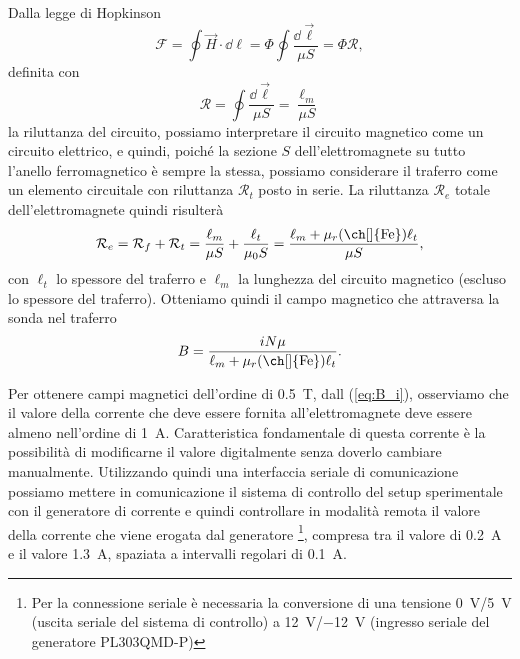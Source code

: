 \documentclass[
    prl,
    reprint, 
    superscriptaddress, 
    altaffilletter, 
    amsmath, 
    amssymb, 
    a4paper,
    varvw]{revtex4-2}
\begin{document}
Dalla legge di Hopkinson \begin{equation}
    \mathcal{F} = \oint \vec{H} \cdot \dd \ell = \Phi \oint \frac{\dd \vec{\ell}}{\mu S} = \Phi \mathcal{R},
\end{equation} definita con \[
    \mathcal{R} = \oint \frac{\dd \vec{\ell}}{\mu S} = \frac{\ell_m}{\mu S}
\] la riluttanza del circuito, possiamo interpretare il circuito magnetico come un circuito elettrico, e quindi, poiché la sezione $S$ dell'elettromagnete su tutto l'anello ferromagnetico è sempre la stessa, possiamo considerare il traferro come un elemento circuitale con riluttanza $\mathcal{R}_t$ posto in serie. La riluttanza $\mathcal{R}_e$ totale dell'elettromagnete quindi risulterà \begin{equation}
    \mathcal{R}_e = \mathcal{R}_f + \mathcal{R}_t = \frac{\ell_m}{\mu S} + \frac{\ell_t}{\mu_0 S} = \frac{\ell_m + \mu_r\text{(\ch[]{Fe})}\ell_t}{\mu S},
\end{equation} con $\ell_{t}$ lo spessore del traferro e $\ell_{m}$ la lunghezza del circuito magnetico (escluso lo spessore del traferro). Otteniamo quindi il campo magnetico che attraversa la sonda nel traferro \begin{equation}
    B = \frac{iN\mu}{\ell_m + \mu_r\text{(\ch[]{Fe})}\ell_t}.\label{eq:B_i}
\end{equation}

Per ottenere campi magnetici dell'ordine di \SI{0.5}{\tesla}, dall (\ref{eq:B_i}), osserviamo che il valore della corrente che deve essere fornita all'elettromagnete deve essere almeno nell'ordine di \SI{1}{\ampere}. Caratteristica fondamentale di questa corrente è la possibilità di modificarne il valore digitalmente senza doverlo cambiare manualmente. Utilizzando quindi una interfaccia seriale di comunicazione possiamo mettere in comunicazione il sistema di controllo del setup sperimentale con il generatore di corrente e quindi controllare in modalità remota il valore della corrente che viene erogata dal generatore \footnote{Per la connessione seriale è necessaria la conversione di una tensione \SI{0}{\volt}/\SI{5}{\volt} (uscita seriale del sistema di controllo) a \SI{+12}{\volt}/\SI{-12}{\volt} (ingresso seriale del generatore PL303QMD-P)}, compresa tra il valore di \SI{0.2}{\ampere} e il valore \SI{1.3}{\ampere}, spaziata a intervalli regolari di \SI{0.1}{\ampere}.
\end{document}
